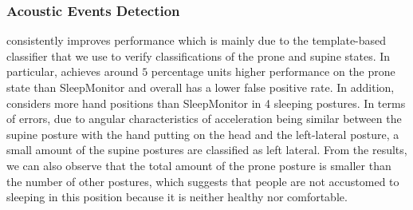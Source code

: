  \subsubsection{Acoustic Events Detection}

consistently improves performance which is mainly due to the template-based classifier that we use to verify classifications of the prone
and supine states. In particular, {\systemname} achieves around $5$ percentage units higher performance on the prone state than
SleepMonitor and overall has a lower false positive rate. In addition, {\systemname} considers more hand positions than SleepMonitor in 4
sleeping postures. In terms of errors, due to angular characteristics of acceleration being similar between the supine posture with the
hand putting on the head and the left-lateral posture, a small amount of the supine postures are classified as left lateral. From the
results, we can also observe that the total amount of the prone posture is smaller than the number of other postures, which suggests that
people are not accustomed to sleeping in this position because it is neither healthy nor comfortable.

